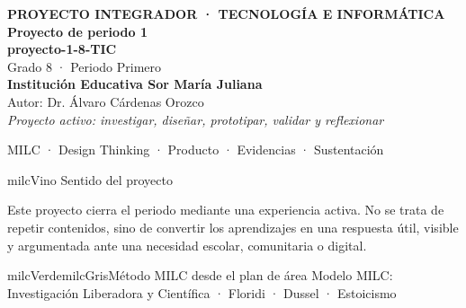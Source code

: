 \documentclass[11pt,letterpaper]{article}
\begin{document}
\thispagestyle{empty}

\vspace*{.85cm}
\begin{tcolorbox}[
  enhanced,colback=milcVino,colframe=milcVino,arc=12mm,width=.86\textwidth,
  boxrule=0pt,left=12mm,right=12mm,top=11mm,bottom=11mm,center,
  overlay={\draw[milcMagenta,line width=2pt,dash pattern=on 9pt off 8pt,rounded corners=10mm]
  ([xshift=7mm,yshift=-7mm]frame.north west) rectangle ([xshift=-7mm,yshift=7mm]frame.south east);}]
  \centering
  {\sffamily\bfseries\color{white}\fontsize{15}{17}\selectfont PROYECTO INTEGRADOR · TECNOLOGÍA E INFORMÁTICA}\\[1.0cm]
  {\sffamily\bfseries\color{white}\fontsize{30}{33}\selectfont Proyecto de periodo 1}\\[3mm]
  {\sffamily\bfseries\color{milcMostaza}\fontsize{25}{28}\selectfont proyecto-1-8-TIC}\\[8mm]
  {\sffamily\color{white}\Large Grado 8 · Periodo Primero}\\[1.0cm]
  {\sffamily\bfseries\color{white}\large Institución Educativa Sor María Juliana}\\[2mm]
  {\sffamily\color{white}Autor: Dr. Álvaro Cárdenas Orozco}\\[4mm]
  {\sffamily\itshape\color{white}Proyecto activo: investigar, diseñar, prototipar, validar y reflexionar}
\end{tcolorbox}
\vfill
\begin{tcolorbox}[enhanced,colback=milcVino!72!black,colframe=milcVino!72!black,arc=5mm,boxrule=0pt,width=.86\textwidth,left=6mm,right=6mm,top=4mm,bottom=4mm,center]
{\color{white}\sffamily\small MILC · Design Thinking · Producto · Evidencias · Sustentación}
\end{tcolorbox}

\newpage
\begin{titlebox}{milcVino}
Sentido del proyecto
\end{titlebox}
\begin{multicols}{2}
Este proyecto cierra el periodo mediante una experiencia activa. No se trata de repetir contenidos, sino de convertir los aprendizajes en una respuesta útil, visible y argumentada ante una necesidad escolar, comunitaria o digital.

\columnbreak
\begin{softbox}{milcVerde}{milcGris}{Método MILC desde el plan de área}
Modelo MILC: Investigación Liberadora y Científica · Floridi · Dussel · Estoicismo
\end{softbox}
\end{multicols}
\end{document}
